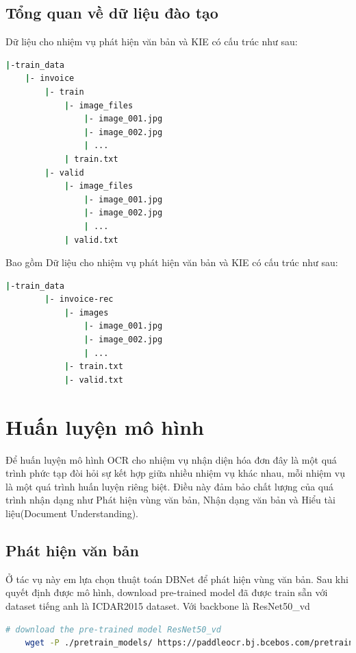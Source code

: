 \subsection{Tổng quan về dữ liệu đào tạo}
Dữ liệu cho nhiệm vụ phát hiện văn bản và KIE có cấu trúc như sau:
\begin{lstlisting}[language=bash]
|-train_data
    |- invoice
        |- train
            |- image_files
                |- image_001.jpg
                |- image_002.jpg
                | ...
            | train.txt
        |- valid
            |- image_files
                |- image_001.jpg
                |- image_002.jpg
                | ...
            | valid.txt  
\end{lstlisting}

Bao gồm 
Dữ liệu cho nhiệm vụ phát hiện văn bản và KIE có cấu trúc như sau:
\begin{lstlisting}[language=bash]
    |-train_data
        |- invoice-rec
            |- images
                |- image_001.jpg
                |- image_002.jpg
                | ...
            |- train.txt
            |- valid.txt
    \end{lstlisting}

\section{Huấn luyện mô hình}
Để huấn luyện mô hình OCR cho nhiệm vụ nhận diện hóa đơn đây là một quá trình phức tạp đòi hỏi sự kết hợp giữa nhiều nhiệm vụ khác nhau, mỗi nhiệm vụ là một quá trình huấn luyện riêng biệt. Điều này đảm bảo chất lượng của quá trình nhận dạng như Phát hiện vùng văn bản, Nhận dạng văn bản và Hiểu tài liệu(Document Understanding).

\subsection{Phát hiện văn bản} \label{train-text-detection}
Ở tác vụ này em lựa chọn thuật toán DBNet để phát hiện vùng văn bản. Sau khi quyết định được mô hình, download pre-trained model đã được train sẵn với dataset tiếng anh là ICDAR2015 dataset. Với backbone là ResNet50\_vd
\begin{lstlisting}[language=bash]
    # download the pre-trained model ResNet50_vd
    wget -P ./pretrain_models/ https://paddleocr.bj.bcebos.com/pretrained/ResNet50_vd_ssld_pretrained.pdparams
\end{lstlisting}

